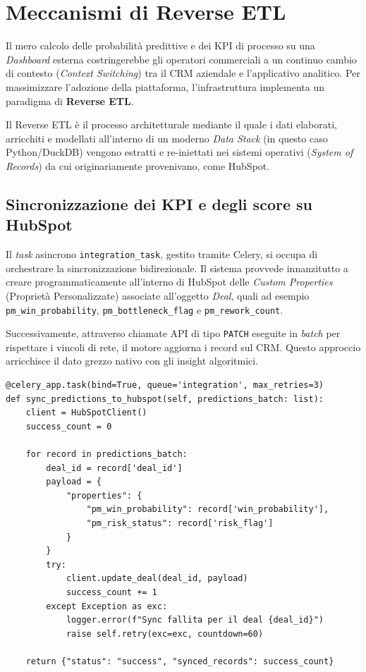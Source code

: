 \documentclass[12pt, a4paper]{report}
\begin{document}
\section{Meccanismi di Reverse ETL}
Il mero calcolo delle probabilità predittive e dei KPI di processo su una \textit{Dashboard} esterna costringerebbe gli operatori commerciali a un continuo cambio di contesto (\textit{Context Switching}) tra il CRM aziendale e l'applicativo analitico. Per massimizzare l'adozione della piattaforma, l'infrastruttura implementa un paradigma di \textbf{Reverse ETL}.

Il Reverse ETL è il processo architetturale mediante il quale i dati elaborati, arricchiti e modellati all'interno di un moderno \textit{Data Stack} (in questo caso Python/DuckDB) vengono estratti e re-iniettati nei sistemi operativi (\textit{System of Records}) da cui originariamente provenivano, come HubSpot.

\subsection{Sincronizzazione dei KPI e degli score su HubSpot}
Il \textit{task} asincrono \texttt{integration\_task}, gestito tramite Celery, si occupa di orchestrare la sincronizzazione bidirezionale. Il sistema provvede innanzitutto a creare programmaticamente all'interno di HubSpot delle \textit{Custom Properties} (Proprietà Personalizzate) associate all'oggetto \textit{Deal}, quali ad esempio \texttt{pm\_win\_probability}, \texttt{pm\_bottleneck\_flag} e \texttt{pm\_rework\_count}.

Successivamente, attraverso chiamate API di tipo \texttt{PATCH} eseguite in \textit{batch} per rispettare i vincoli di rete, il motore aggiorna i record sul CRM. Questo approccio arricchisce il dato grezzo nativo con gli insight algoritmici.

\begin{verbatim}
@celery_app.task(bind=True, queue='integration', max_retries=3)
def sync_predictions_to_hubspot(self, predictions_batch: list):
    client = HubSpotClient()
    success_count = 0
    
    for record in predictions_batch:
        deal_id = record['deal_id']
        payload = {
            "properties": {
                "pm_win_probability": record['win_probability'],
                "pm_risk_status": record['risk_flag']
            }
        }
        try:
            client.update_deal(deal_id, payload)
            success_count += 1
        except Exception as exc:
            logger.error(f"Sync fallita per il deal {deal_id}")
            raise self.retry(exc=exc, countdown=60)
            
    return {"status": "success", "synced_records": success_count}
\end{verbatim}
\end{document}
